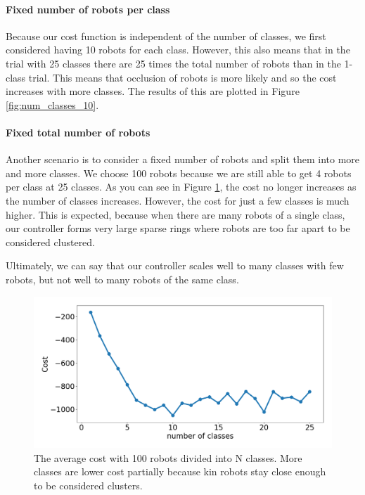\documentclass[conference]{IEEEtran}
\begin{document}
    \paragraph{Fixed number of robots per class}

    Because our cost function is independent of the number of classes, we first considered having 10 robots for each class. However, this also means that in the trial with 25 classes there are 25 times the total number of robots than in the 1-class trial. This means that occlusion of robots is more likely and so the cost increases with more classes. The results of this are plotted in Figure  \ref{fig:num_classes_10}.

    \paragraph{Fixed total number of robots}

    Another scenario is to consider a fixed number of robots and split them into more and more classes. We choose 100 robots because we are still able to get 4 robots per class at 25 classes. As you can see in Figure \ref{fig:num_classes_100}, the cost no longer increases as the number of classes increases. However, the cost for just a few classes is much higher. This is expected, because when there are many robots of a single class, our controller forms very large sparse rings where robots are too far apart to be considered clustered.

    Ultimately, we can say that our controller scales well to many classes with few robots, but not well to many robots of the same class.

    \begin{figure}[H]
      \centering
      \includegraphics[width=1\linewidth]{./images/num_classes_vs_cost_100_robots.png}
      \caption{The average cost with 100 robots divided into N classes. More classes are lower cost partially because kin robots stay close enough to be considered clusters.}
      \label{fig:num_classes_100}
    \end{figure}
\end{document}
